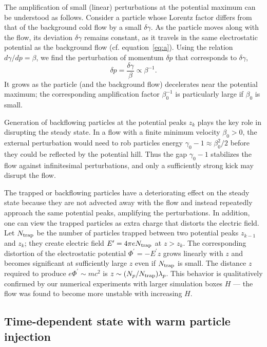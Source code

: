 The amplification of small (linear) perturbations at the potential maximum can be
understood as follows.
Consider a particle whose Lorentz factor differs from that of the background cold
flow by a small $\delta\gamma$. As the particle moves along with the flow, its deviation
$\delta\gamma$ remains constant, as it travels in the same electrostatic potential as
the background flow (cf. equation~\ref{eq:a}). Using the relation $d\gamma/dp=\beta$, we
find the perturbation of momentum $\delta p$ that corresponds to $\delta\gamma$,
\begin{equation}
    \delta p = \frac{\delta\gamma}{\beta}\propto \beta^{-1}.
\end{equation}
It grows as the particle (and the background flow) decelerates near the potential maximum;
the corresponding amplification factor $\beta_0^{-1}$ is particularly large if
$\beta_0$ is small.

Generation of backflowing particles at the potential peaks $z_k$ plays the key role in
disrupting the steady state. In a flow with a finite minimum velocity
$\beta_0>0$, the external perturbation would need to rob particles
energy $\gamma_0-1\approx \beta_0^2/2$ before they could be reflected by the
potential hill. Thus the gap $\gamma_0-1$ stabilizes the flow against infinitesimal
perturbations, and only a sufficiently strong kick may disrupt the flow.

The trapped or backflowing particles have a deteriorating effect on the steady state
because they are not advected away with the flow and instead repeatedly approach
the same potential peaks, amplifying the perturbations. In addition, one can view
the trapped particles as extra
charge that distorts the electric field. Let $N_{\rm trap}$ be the number of particles
trapped between two potential peaks $z_{k-1}$ and $z_k$; they create electric field
$E^\prime=4\pi eN_{\rm trap}$ at $z>z_k$. The corresponding distortion of the
electrostatic potential $\Phi^\prime=-E^\prime z$ grows linearly with $z$ and
becomes significant at sufficiently large $z$ even if $N_{\rm trap}$ is small.
The distance $z$ required to produce
$e\Phi^\prime \sim mc^2$ is $z\sim (N_p/N_{\rm trap})\lambda_p$.
This behavior is qualitatively confirmed by our numerical experiments with
larger simulation boxes $H$ --- the flow
was found to become more unstable with increasing $H$.


\subsection{Time-dependent state with warm particle injection}\label{sec:warm}


